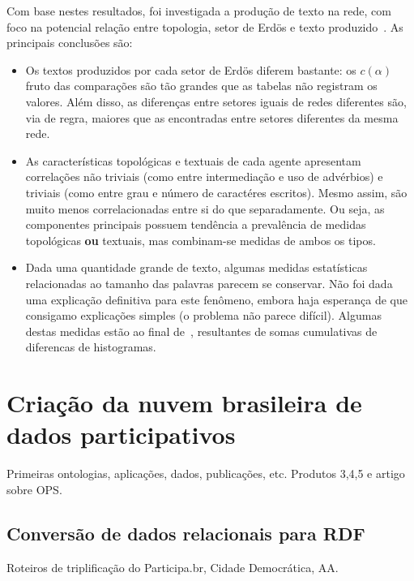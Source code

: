 \documentclass[a4paper,openright,12pt]{report} %
\begin{document}
Com base nestes resultados, foi investigada a produção de texto na rede,
com foco na potencial relação entre topologia, setor de Erdös e texto produzido~\cite{rcText}. As principais conclusões são:
\begin{itemize}
	\item Os textos produzidos por cada setor de Erdös diferem bastante: os $c(\alpha)$ fruto das comparações são tão grandes que as tabelas não registram os valores. Além disso, as diferenças entre setores iguais de redes diferentes são, via de regra, maiores que as encontradas entre setores diferentes da mesma rede.
	\item As características topológicas e textuais de cada agente apresentam correlações não triviais (como entre intermediação e uso de advérbios) e triviais (como entre grau e número de caractéres escritos).
		Mesmo assim, são muito menos correlacionadas entre si do que separadamente. Ou seja, as componentes principais possuem tendência
		a prevalência de medidas topológicas {\bf ou} textuais,
		mas combinam-se medidas de ambos os tipos.
	\item Dada uma quantidade grande de texto, algumas medidas estatísticas 
		relacionadas ao tamanho das palavras parecem se conservar. Não foi dada uma explicação definitiva para este fenômeno, embora haja esperança de que consigamo explicações simples (o problema não parece difícil). Algumas destas medidas estão ao final de~\cite{rcText}, resultantes de somas cumulativas de diferencas de histogramas.
\end{itemize}


\section{Criação da nuvem brasileira de dados participativos}
Primeiras ontologias, aplicações, dados, publicações, etc.
Produtos 3,4,5 e artigo sobre OPS.
\subsection{Conversão de dados relacionais para RDF}
Roteiros de triplificação do Participa.br, Cidade Democrática, AA.
\end{document}
